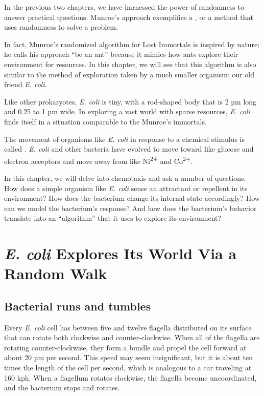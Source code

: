 In the previous two chapters, we have harnessed the power of randomness to answer practical questions. Munroe's approach exemplifies a , or a method that uses randomness to solve a problem.

In fact, Munroe's randomized algorithm for Lost Immortals is inspired by nature; he calls his approach ``be an ant'' because it mimics how ants explore their environment for resources. In this chapter, we will see that this algorithm is also similar to the method of exploration taken by a much smaller organism: our old friend \textit{E. coli}.

Like other prokaryotes, \textit{E. coli} is tiny, with a rod-shaped body that is 2 µm long and 0.25 to 1 µm wide. In exploring a vast world with sparse resources, \textit{E. coli} finds itself in a situation comparable to the Munroe's immortals.

The movement of organisms like \textit{E. coli} in response to a chemical stimulus is called . \textit{E. coli} and other bacteria have evolved to move toward  like glucose and electron acceptors and move away from  like Ni\textsuperscript{2+} and Co\textsuperscript{2+}.

In this chapter, we will delve into chemotaxis and ask a number of questions. How does a simple organism like \textit{E. coli} sense an attractant or repellent in its environment? How does the bacterium change its internal state accordingly? How can we model the bacterium's response? And how does the bacterium's behavior translate into an ``algorithm'' that it uses to explore its environment?\\

\FloatBarrier
{}
\section{\textit{E. coli} Explores Its World Via a Random Walk}
\label{sec:e_coli_explores_its_world_via_a_random_walk}

\subsection{Bacterial runs and tumbles}

Every \textit{E. coli} cell has between five and twelve flagella distributed on its surface that can rotate both clockwise and counter-clockwise. When all of the flagella are rotating counter-clockwise, they form a bundle and propel the cell forward at about 20 µm per second. This speed may seem insignificant, but it is about ten times the length of the cell per second, which is analogous to a car traveling at 160 kph. When a flagellum rotates clockwise, the flagella become uncoordinated, and the bacterium stops and rotates.

